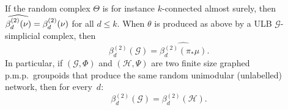 \documentclass[AHL,Unicode,longabstracts,published]{cedram}
\newcommand{\ch}{\mathcal{H}}
\newcommand{\cg}{\mathcal{G}}
\newcommand{\pmp}{p.m.p.\ }
\begin{document}
\begin{rema}
If the random complex $\Theta$ is for instance $k$-connected almost surely, then $\widehat{\beta_d^{(2)}(\nu)}=\linebreak\beta_d^{(2)}(\nu)$ for all $d\leq k$. When $\theta$ is produced as above by a ULB $\cg$-simplicial complex, then
\[
\beta^{(2)}_d(\cg)= \widehat{\beta^{(2)}_d(\pi_*\mu)}.
\]
In particular, if $(\cg,\Phi)$ and $(\ch,\Psi)$ are two finite size graphed \pmp groupoids that produce the same random unimodular (unlabelled) network, then for every~$d$:
\[
\beta^{(2)}_d(\cg)=\beta^{(2)}_d(\ch).
\]
\end{rema}



% 


\end{document}
